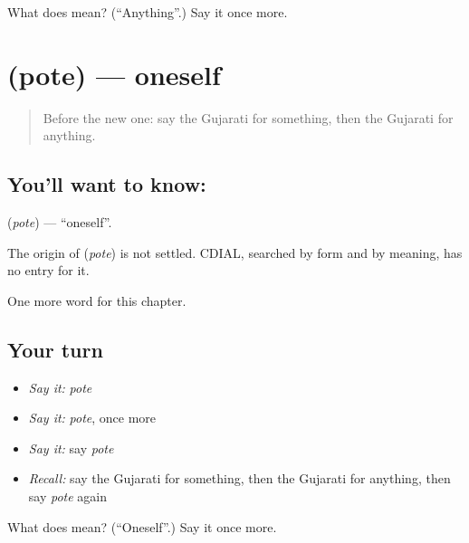 \begin{tcolorbox}[breakable,colback=teal!4,colframe=teal!35!black,title={Before you move on}]
What does  mean? (\textquotedblleft{}Anything\textquotedblright{}.) Say it once more.
\end{tcolorbox}
\section[\texorpdfstring{\gu{પોતે} (pote)}{પોતે (pote)}]{ (pote) — oneself}

\label{lesson:GU-C100-pote}



\begin{quote}
Before the new one: say the Gujarati for something, then the Gujarati for anything.
\end{quote}

\subsection*{You'll want to know: }
\textbf{} (\emph{pote}) — \textquotedblleft{}oneself\textquotedblright{}.

\begin{cousinweb}
The origin of \textbf{} (\emph{pote}) is not settled. CDIAL, searched by form and by meaning, has no entry for it.
\end{cousinweb}

\begin{grammarlens}[title={What you've built}]
One more word for this chapter.
\end{grammarlens}

\subsection*{Your turn}
\begin{itemize}
\raggedright
  \item \emph{Say it:} \emph{pote}
  \item \emph{Say it:} \emph{pote}, once more
  \item \emph{Say it:} say \emph{pote}
  \item \emph{Recall:} say the Gujarati for something, then the Gujarati for anything, then say \emph{pote} again
\end{itemize}

\begin{tcolorbox}[breakable,colback=teal!4,colframe=teal!35!black,title={Before you move on}]
What does  mean? (\textquotedblleft{}Oneself\textquotedblright{}.) Say it once more.
\end{tcolorbox}
